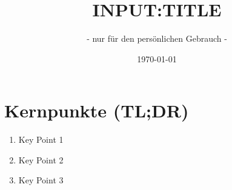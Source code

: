 \documentclass{article}
\title{{{INPUT:TITLE}}}
\subtitle{- nur für den persönlichen Gebrauch -}
\date{\today} %
\begin{document}
\maketitle %
\thispagestyle{fancy} %
\hypertarget{toc}{}


\tableofcontents %
\listoftables
\listoffigures
\hypersetup{
  linkcolor = red!70!black,
  citecolor = black, %
  urlcolor = blue    %
}





\section{Kernpunkte (TL;DR)} %
\begin{enumerate}
    \item Key Point 1
    \item Key Point 2
    \item Key Point 3
\end{enumerate}
\end{document}
